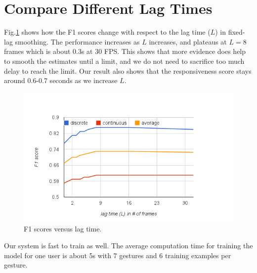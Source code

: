 
\section{Compare Different Lag Times}
Fig.\ref{fig:lag} shows how the F1 scores change with respect to the lag time
($L$) in fixed-lag smoothing. The performance increases as $L$ increases, and
plateaus at $L=8$ frames which is about 0.3s at 30 FPS. This shows that more
evidence does help to smooth the estimates until a limit, and we do not need to
sacrifice too much delay to reach the limit. Our result also shows that the
responsiveness score stays around 0.6-0.7 seconds as we increase $L$.

\begin{figure}[t]
\centering
\includegraphics[trim=0 5mm 0 15mm, clip,
width=\columnwidth]{figures/f1_lag.png}
\caption{F1 scores versus lag time.}
\label{fig:lag}
\end{figure}

Our system is fast to train as well. The average computation time for training
the model for one user is about 5s with 7 gestures and 6 training examples per
gesture.